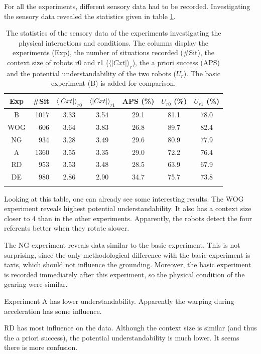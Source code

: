For all the experiments, different sensory data had to be recorded. Investigating the sensory data revealed the statistics given in table \ref{t:par:stats}.

\begin{table}
\centering
\begin{tabular}{crccccc}
\lsptoprule
Exp & \#Sit & $\langle | Cxt | \rangle_{r0}$ & $\langle | Cxt | \rangle_{r1}$ & APS (\%) & $U_{r0}$ (\%) & $U_{r1}$ (\%)\\\midrule
B & 1017 & 3.33 & 3.54 & 29.1 & 81.1 & 78.0\\%
WOG & 606 & 3.64 & 3.83 & 26.8 & 89.7 & 82.4\\%
NG & 934 & 3.28 & 3.49 & 29.6 & 80.9 & 77.9\\%
A & 1360 & 3.55 & 3.35 & 29.0 & 72.2 & 76.4\\%
RD & 953 & 3.53 & 3.48 & 28.5 & 63.9 & 67.9\\%
DE & 980 & 2.86 & 2.90 & 34.7 & 75.7 & 73.8\\%
\lspbottomrule
\end{tabular}
\caption{The statistics of the sensory data of the experiments investigating the physical interactions and conditions. The columns display the experiments (Exp), the number of situations recorded (\#Sit), the context size of robots r0 and r1 ($\langle | Cxt | \rangle_{r}$), the a priori success (APS) and the potential understandability of the two robots ($U_{r}$). The basic experiment (B) is added for comparison.}
\label{t:par:stats}
\end{table}


Looking at this table, one can already see some interesting results. The WOG experiment reveals highest potential understandability. It also has a context size closer to 4 than in the other experiments. Apparently, the robots detect the four referents better when they rotate slower. 

The NG experiment reveals data similar to the basic experiment. This is not surprising, since the only methodological difference with the basic experiment is taxis, which should not influence the grounding. Moreover, the basic experiment is recorded immediately after this experiment, so the physical condition of the gearing were similar.

Experiment A has lower understandability. Apparently the warping during acceleration has some influence.

RD has most influence on the data. Although the context size is similar (and thus the a priori success), the potential understandability is much lower. It seems there is more confusion.

